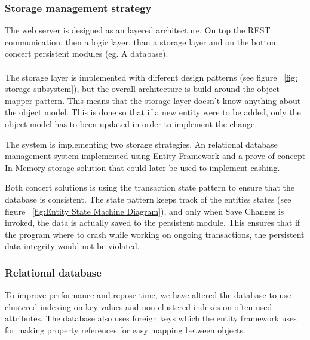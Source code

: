 \subsubsection{Storage management strategy}
The web server is designed as an layered architecture. On top the REST communication, then a logic layer, than a storage layer and on the bottom concert persistent modules (eg. A database).\\\\
The storage layer is implemented with different design patterns (see figure ~\ref{fig: storage subsystem}), but the overall architecture is build around the object-mapper pattern. This means that the storage layer doesn't know anything about the object model. This is done so that if a new entity were to be added, only the object model has to been updated in order to implement the change. 

The system is implementing two storage strategies. An relational database management system implemented using Entity Framework and a prove of concept In-Memory storage solution that could later be used to implement cashing. 

Both concert solutions is using the transaction state pattern to ensure that the database is consistent. The state pattern keeps track of the entities states (see figure ~\ref{fig:Entity State Machine Diagram}), and only when Save Changes is invoked, the data is actually saved to the persistent module. This ensures that if the program where to crash while working on ongoing transactions, the persistent data integrity would not be violated.  

\subsubsection{Relational database}
To improve performance and repose time, we have altered the database to use clustered indexing on key values and non-clustered indexes on often used attributes. The database also uses foreign keys which the entity framework uses for making property references for easy mapping between objects. 



